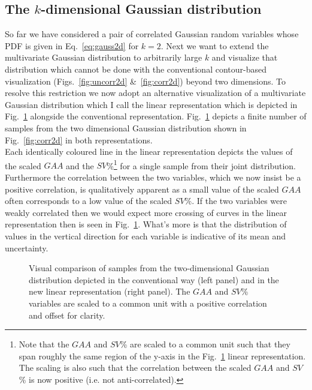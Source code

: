\subsection{The $k$-dimensional Gaussian distribution}
So far we have considered a pair of correlated Gaussian random variables whose
PDF is given in Eq.~\ref{eq:gauss2d} for $k=2$. Next we want to extend the multivariate
Gaussian distribution to arbitrarily large $k$ and visualize that distribution which
cannot be done with the conventional contour-based visualization
(Figs.~\ref{fig:uncorr2d} \&~\ref{fig:corr2d}) beyond two dimensions. To resolve this
restriction we now adopt an alternative visualization of a multivariate Gaussian
distribution which I call the linear representation which is depicted in
Fig.~\ref{fig:linrep} alongside the conventional representation. Fig.~\ref{fig:linrep}
depicts a finite number of samples from the two dimensional Gaussian distribution shown
in Fig.~\ref{fig:corr2d} in both representations. \\

Each identically coloured line in the
linear representation depicts the values of the scaled $GAA$ and the $SV$\%\footnote{Note
  that the $GAA$ and $SV$\% are scaled to a common unit such that they span roughly
  the same region of the y-axis in the Fig.~\ref{fig:linrep} linear representation.
  The scaling is also such that the correlation between the scaled $GAA$ and $SV$\% is
  now positive (i.e. not anti-correlated).} for a single
sample from their joint distribution. Furthermore the correlation between the two variables,
which we now insist be a positive correlation, is qualitatively apparent as a small value
of the scaled $GAA$ often corresponds to a low value of the scaled $SV$\%. If the two
variables were weakly correlated then we would expect more crossing of curves in the
linear representation then is seen in Fig.~\ref{fig:linrep}. What's more is that the
distribution of values in the vertical direction for each variable is indicative of its
mean and uncertainty. \\

\begin{figure}
  \centering
  \caption[Linear representation of Gaussian random variables in two dimensions.]
          {Visual comparison of samples from the two-dimensional Gaussian distribution
            depicted in the
            conventional way (left panel) and in the new linear representation (right
            panel). The $GAA$ and $SV$\% variables are scaled to a common unit with a
            positive correlation and offset for clarity.}
  \label{fig:linrep}
\end{figure}



